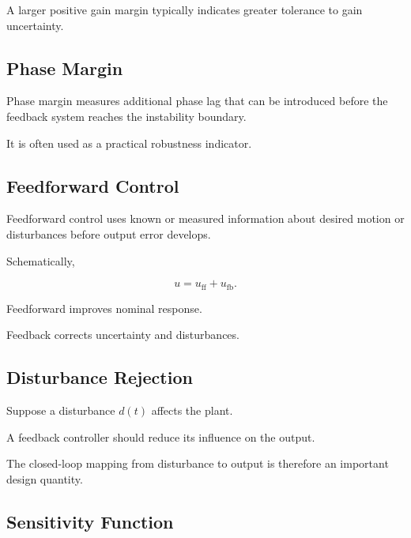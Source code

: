 A larger positive gain margin typically indicates greater tolerance to gain
uncertainty.

\subsection{Phase Margin}
\label{subsec:phase-margin}

Phase margin measures additional phase lag that can be introduced before the
feedback system reaches the instability boundary.

It is often used as a practical robustness indicator.

\subsection{Feedforward Control}
\label{subsec:feedforward-control}

Feedforward control uses known or measured information about desired motion
or disturbances before output error develops.

Schematically,

\[
\boxed{
u
=
u_{\mathrm{ff}}
+
u_{\mathrm{fb}}.
}
\]

Feedforward improves nominal response.

Feedback corrects uncertainty and disturbances.

\subsection{Disturbance Rejection}
\label{subsec:disturbance-rejection}

Suppose a disturbance \(d(t)\) affects the plant.

A feedback controller should reduce its influence on the output.

The closed-loop mapping from disturbance to output is therefore an important
design quantity.

\subsection{Sensitivity Function}
\label{subsec:control-sensitivity-function}

